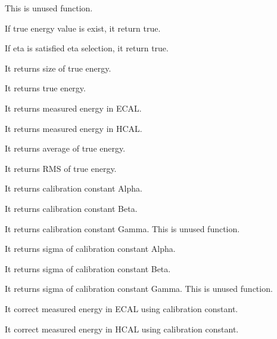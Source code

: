 \documentclass{cernrep}
\begin{document}

This is unused function.


If true energy value is exist, it return true.


If eta is satisfied eta selection, it return true.


It returns size of true energy.


It returns true energy.


It returns measured energy in ECAL.


It returns measured energy in HCAL.


It returns average of true energy.


It returns RMS of true energy.


It returns calibration constant Alpha.


It returns calibration constant Beta.


It returns calibration constant Gamma. This is unused function.


It returns sigma of calibration constant Alpha.


It returns sigma of calibration constant Beta.


It returns sigma of calibration constant Gamma. This is unused function.


It correct measured energy in ECAL using calibration constant.


It correct measured energy in HCAL using calibration constant.
\end{document}
